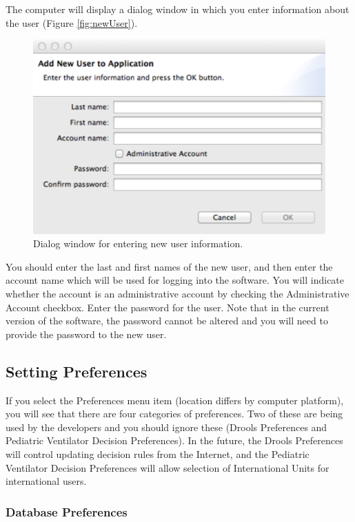  The computer
will display a dialog window in which you enter information about the user (Figure \vref{fig:newUser}).

\begin{figure}[ht] 
   \centering
   \includegraphics[width=\textwidth]{NewUserDialog} 
   \caption{Dialog window for entering new user information.}
   \label{fig:newUser}
\end{figure}

You should enter the last and first names of the new user, and then enter the account name
which will be used for logging into the software.  You will indicate whether the account is
an administrative account by checking the Administrative Account checkbox.  Enter the password
for the user.  Note that in the current version of the software, the password cannot be altered and
you will need to provide the password to the new user.



\subsection{Setting Preferences}
If you select the Preferences menu item (location differs by computer platform), you will see that there
are four categories of preferences.  Two of these are being used by the developers and you should ignore these (Drools Preferences
and Pediatric Ventilator Decision Preferences).  In the future, the Drools Preferences will control updating
decision rules from the Internet, and the Pediatric Ventilator Decision Preferences will allow selection of
International Units for international users.

\subsubsection{Database Preferences}

